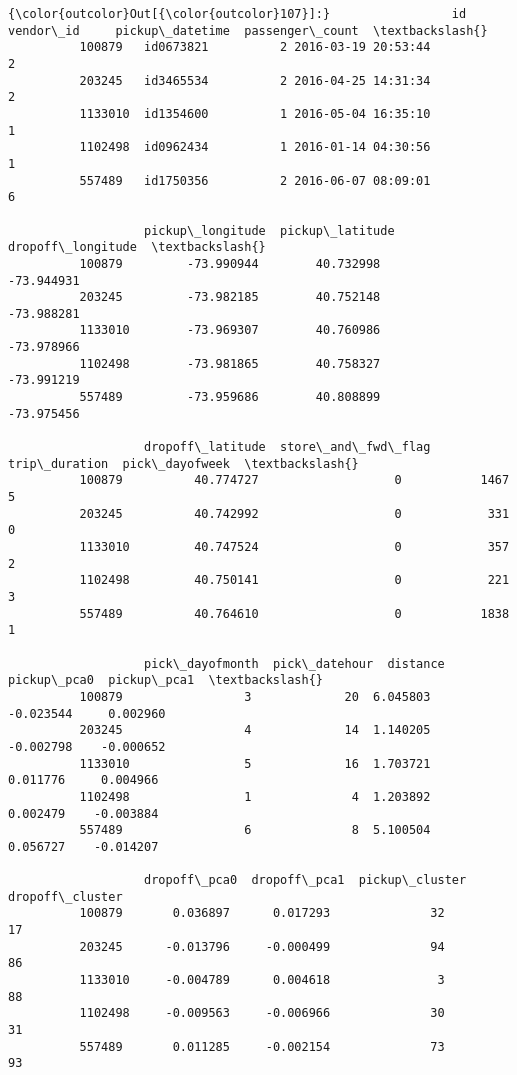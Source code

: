 \documentclass[11pt]{article}
\begin{document}
\begin{Verbatim}[commandchars=\\\{\}]
{\color{outcolor}Out[{\color{outcolor}107}]:}                 id  vendor\_id     pickup\_datetime  passenger\_count  \textbackslash{}
          100879   id0673821          2 2016-03-19 20:53:44                2   
          203245   id3465534          2 2016-04-25 14:31:34                2   
          1133010  id1354600          1 2016-05-04 16:35:10                1   
          1102498  id0962434          1 2016-01-14 04:30:56                1   
          557489   id1750356          2 2016-06-07 08:09:01                6   
          
                   pickup\_longitude  pickup\_latitude  dropoff\_longitude  \textbackslash{}
          100879         -73.990944        40.732998         -73.944931   
          203245         -73.982185        40.752148         -73.988281   
          1133010        -73.969307        40.760986         -73.978966   
          1102498        -73.981865        40.758327         -73.991219   
          557489         -73.959686        40.808899         -73.975456   
          
                   dropoff\_latitude  store\_and\_fwd\_flag  trip\_duration  pick\_dayofweek  \textbackslash{}
          100879          40.774727                   0           1467               5   
          203245          40.742992                   0            331               0   
          1133010         40.747524                   0            357               2   
          1102498         40.750141                   0            221               3   
          557489          40.764610                   0           1838               1   
          
                   pick\_dayofmonth  pick\_datehour  distance  pickup\_pca0  pickup\_pca1  \textbackslash{}
          100879                 3             20  6.045803    -0.023544     0.002960   
          203245                 4             14  1.140205    -0.002798    -0.000652   
          1133010                5             16  1.703721     0.011776     0.004966   
          1102498                1              4  1.203892     0.002479    -0.003884   
          557489                 6              8  5.100504     0.056727    -0.014207   
          
                   dropoff\_pca0  dropoff\_pca1  pickup\_cluster  dropoff\_cluster  
          100879       0.036897      0.017293              32               17  
          203245      -0.013796     -0.000499              94               86  
          1133010     -0.004789      0.004618               3               88  
          1102498     -0.009563     -0.006966              30               31  
          557489       0.011285     -0.002154              73               93  
\end{Verbatim}
            
\end{document}
